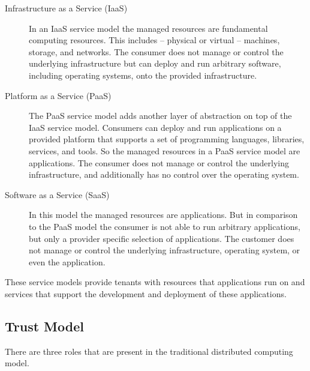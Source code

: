 \begin{description}
  \item[Infrastructure as a Service (IaaS)]
    In an IaaS service model the managed resources are fundamental computing
    resources. This includes -- physical or virtual -- machines, storage, and
    networks. The consumer does not manage or control the underlying
    infrastructure but can deploy and run arbitrary software, including
    operating systems, onto the provided infrastructure.

  \item[Platform as a Service (PaaS)]
    The PaaS service model adds another layer of abstraction on top of the IaaS
    service model. Consumers can deploy and run applications on a provided
    platform that supports a set of programming languages, libraries, services,
    and tools. So the managed resources in a PaaS service model are
    applications. The consumer does not manage or control the underlying
    infrastructure, and additionally has no control over the operating system.

  \item[Software as a Service (SaaS)]
    In this model the managed resources are applications. But in comparison to
    the PaaS model the consumer is not able to run arbitrary applications, but
    only a provider specific selection of applications. The customer does not
    manage or control the underlying infrastructure, operating system, or even
    the application.
\end{description}

These service models provide tenants with resources that applications run on and
services that support the development and deployment of these applications.

\subsection{Trust Model}

There are three roles that are present in the traditional distributed computing
model.

